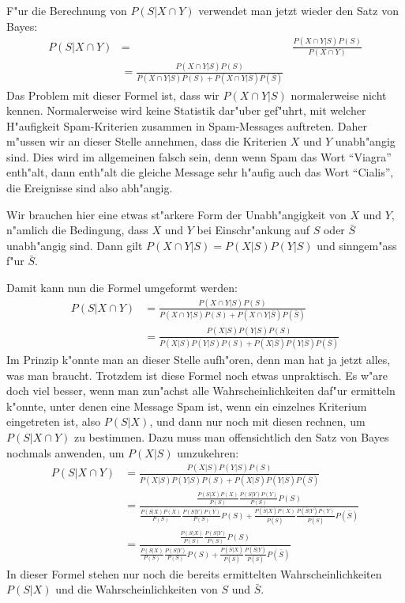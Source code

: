 F"ur die Berechnung von $P(S|X\cap Y)$ verwendet man jetzt wieder
den Satz von Bayes:
\begin{align}
P(S|X\cap Y)&=&\frac{P(X\cap Y|S)P(S)}{P(X\cap Y)}\nonumber
\\
&=
\frac{P(X\cap Y|S)P(S)}{P(X\cap Y|S)P(S)+P(X\cap Y|\bar S)P(\bar S)}
\end{align}
Das Problem mit dieser Formel ist, dass wir $P(X\cap Y|S)$ normalerweise
nicht kennen. Normalerweise wird keine Statistik dar"uber gef"uhrt, mit
welcher H"aufigkeit Spam-Kriterien zusammen in Spam-Messages auftreten.
Daher m"ussen wir an dieser Stelle annehmen, dass die Kriterien $X$ und $Y$
unabh"angig sind. Dies wird im allgemeinen falsch sein, denn wenn Spam
das Wort ``Viagra'' enth"alt, dann enth"alt die gleiche Message sehr h"aufig
auch das Wort ``Cialis'', die Ereignisse sind also abh"angig.

Wir brauchen hier eine etwas st"arkere Form der Unabh"angigkeit von $X$ und $Y$,
n"amlich die Bedingung, dass $X$ und $Y$ bei Einschr"ankung auf $S$
oder $\bar S$ unabh"angig sind. Dann gilt $P(X\cap Y|S)=P(X|S)P(Y|S)$
und sinngem"ass f"ur $\bar S$.

Damit kann nun die Formel umgeformt werden:
\begin{align}
P(S|X\cap Y)
&=
\frac{P(X\cap Y|S)P(S)}{P(X\cap Y|S)P(S)+P(X\cap Y|\bar S)P(\bar S)}\nonumber
\\
&=
\frac{P(X|S)P(Y|S)P(S)}{P(X|S)P(Y|S)P(S)+P(X|\bar S)P(Y|\bar S)P(\bar S)}
\end{align}
Im Prinzip k"onnte man an dieser Stelle aufh"oren, denn man hat ja jetzt
alles, was man braucht. Trotzdem ist diese Formel noch etwas unpraktisch.
Es w"are doch viel besser, wenn man zun"achst alle Wahrscheinlichkeiten
daf"ur ermitteln k"onnte, unter denen eine Message Spam ist, wenn ein
einzelnes Kriterium eingetreten ist, also $P(S|X)$, und dann nur noch
mit diesen rechnen, um $P(S|X\cap Y)$ zu bestimmen.
Dazu muss man offensichtlich den Satz von Bayes nochmals anwenden, um
$P(X|S)$ umzukehren:
\begin{align}
P(S|X\cap Y)
&=
\frac{P(X|S)P(Y|S)P(S)}{P(X|S)P(Y|S)P(S)+P(X|\bar S)P(Y|\bar S)P(\bar S)}\nonumber
\\
&=\frac{\displaystyle
\frac{P(S|X)P(X)}{P(S)}
\frac{P(S|Y)P(Y)}{P(S)}P(S)
}{\displaystyle
\frac{P(S|X)P(X)}{P(S)}
\frac{P(S|Y)P(Y)}{P(S)}P(S)
+
\frac{P(\bar S|X)P(X)}{P(\bar S)}
\frac{P(\bar S|Y)P(Y)}{P(\bar S)}P(\bar S)
}\nonumber
\\
&=
\frac{\displaystyle
\frac{P(S|X)}{P(S)}
\frac{P(S|Y)}{P(S)}P(S)
}{\displaystyle
\frac{P(S|X)}{P(S)}
\frac{P(S|Y)}{P(S)}P(S)
+
\frac{P(\bar S|X)}{P(\bar S)}
\frac{P(\bar S|Y)}{P(\bar S)}P(\bar S)
}
\end{align}
In dieser Formel stehen nur noch die bereits ermittelten Wahrscheinlichkeiten
$P(S|X)$ und die Wahrscheinlichkeiten von $S$ und $\bar S$.

